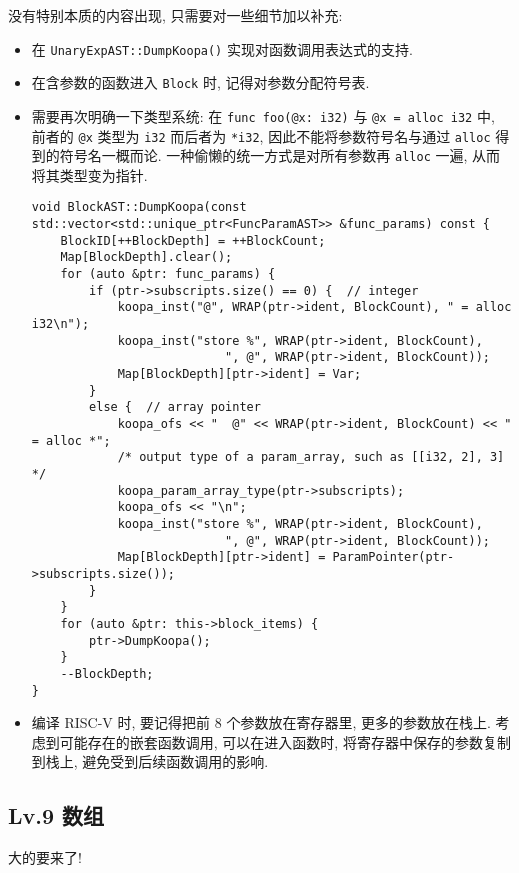 \documentclass[8pt]{article}
\theoremstyle{compact}
\begin{document}
没有特别本质的内容出现, 只需要对一些细节加以补充: \begin{itemize}
    \item 在 \texttt{UnaryExpAST::DumpKoopa()} 实现对函数调用表达式的支持.
    \item 在含参数的函数进入 \texttt{Block} 时, 记得对参数分配符号表.
    \item 需要再次明确一下类型系统: 在 \texttt{func foo(@x: i32)} 与 \texttt{@x = alloc i32} 中, 前者的 \texttt{@x} 类型为 \texttt{i32} 而后者为 \texttt{*i32}, 因此不能将参数符号名与通过 \texttt{alloc} 得到的符号名一概而论. 一种偷懒的统一方式是对所有参数再 \texttt{alloc} 一遍, 从而将其类型变为指针. \begin{verbatim}
void BlockAST::DumpKoopa(const std::vector<std::unique_ptr<FuncParamAST>> &func_params) const {
    BlockID[++BlockDepth] = ++BlockCount;
    Map[BlockDepth].clear();
    for (auto &ptr: func_params) {
        if (ptr->subscripts.size() == 0) {  // integer
            koopa_inst("@", WRAP(ptr->ident, BlockCount), " = alloc i32\n");
            koopa_inst("store %", WRAP(ptr->ident, BlockCount), 
                           ", @", WRAP(ptr->ident, BlockCount));
            Map[BlockDepth][ptr->ident] = Var;
        }
        else {  // array pointer
            koopa_ofs << "  @" << WRAP(ptr->ident, BlockCount) << " = alloc *";
            /* output type of a param_array, such as [[i32, 2], 3] */
            koopa_param_array_type(ptr->subscripts); 
            koopa_ofs << "\n";
            koopa_inst("store %", WRAP(ptr->ident, BlockCount), 
                           ", @", WRAP(ptr->ident, BlockCount));
            Map[BlockDepth][ptr->ident] = ParamPointer(ptr->subscripts.size());
        }
    }
    for (auto &ptr: this->block_items) {
        ptr->DumpKoopa();
    }
    --BlockDepth;
}                
    \end{verbatim}
    \item 编译 RISC-V 时, 要记得把前 8 个参数放在寄存器里, 更多的参数放在栈上. 考虑到可能存在的嵌套函数调用, 可以在进入函数时, 将寄存器中保存的参数复制到栈上, 避免受到后续函数调用的影响.
\end{itemize}

\subsection{Lv.9 数组}
大的要来了!
\end{document}

